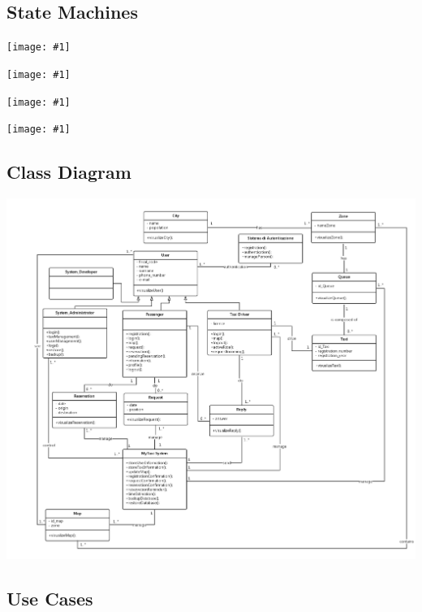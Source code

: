 \documentclass[11pt, a4paper,titlepage]{article}
\newcommand{\image}[1]{
	\begin{center}
		\noindent \texttt{[image: \#1]}
	\end{center}
	}
\begin{document}
\subsection{State Machines}
	\image{diagram_state_machine1.png}
	\image{diagram_state_machine2.png}
	\image{diagram_state_machine3.png}
	\image{diagram_state_machine4.png}
\subsection{Class Diagram}
	 \includegraphics[width=\textwidth]{schema_class_diagram.png}
\pagebreak
\subsection{Use Cases}
\end{document}
